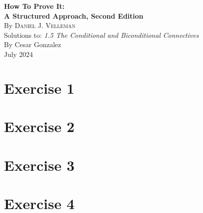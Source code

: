 \documentclass[letterpaper,10pt]{article}
\begin{document}
\pagestyle{fancy}
\setlength{\headheight}{15pt}
	\begin{flushleft}

\begin{center}

    {\Large\textbf{How To Prove It:}\\[0.2em] %
    \Large\textbf{A Structured Approach, Second Edition}}\\[1.5em]

    {\normalsize By \textsc{Daniel J. Velleman}}\\[1.5em]

    Solutions to: \textit{1.5 The Conditional and Biconditional Connectives}\\[1.5em]

    By Cesar Gonzalez\\[0.5em]
    July 2024
\end{center}

\tableofcontents
\newpage

\section*{Exercise 1}


\section*{Exercise 2}


\section*{Exercise 3}


\section*{Exercise 4}



\end{flushleft}
\end{document}
